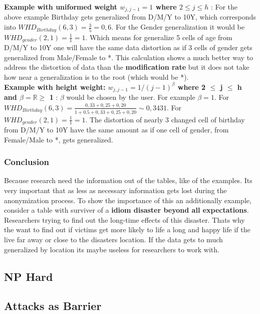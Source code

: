 \documentclass{llncs}
\newcommand{\R}{\mathbb{R}}
\begin{document}
\textbf{Example with uniformed weight $w_{j,j-1} = 1$ where $2\leq j \leq h$} \cite{li2006achieving}: For the above example Birthday gets generalized from D/M/Y to 10Y, which corresponds into $WHD_{Birthday}(6,3) = \frac{3}{5} = 0,6$. For the Gender generalization it would be $WHD_{gender}(2,1) = \frac{1}{1} = 1$. Which means for generalize 5 cells of age from D/M/Y to 10Y one will have the same data distortion as if 3 cells of gender gets generalized from Male/Female to *. This calculation shows a much better way to address the distortion of data than the \textbf{modification rate} but it does not take how near a generalization is to the root (which would be *).\\

\textbf{Example with height weight: $w_{j,j-1} = 1 / (j-1)^{\beta}$ where 2 $\leq$ j $\leq$ h and $\beta = \R \geq$ 1} \cite{li2006achieving}:
$\beta$ would be chosen by the user. For example $\beta = 1$. For $WHD_{Birthday}(6,3) = \frac{0,\overline{33}+0,25+0,20}{1+0.5+0,\overline{33}+0,25+0,20} \sim 0,3431$. For $WHD_{gender}(2,1) = \frac{1}{1} = 1$. The distortion of nearly 3 changed cell of birthday from D/M/Y to  10Y have the same amount as if one cell of gender, from Female/Male to *, gets generalized. 

\subsubsection{Conclusion}

Because research need the information out of the tables, like of the examples. Its very important that as less as necessary information gets lost during the anonymization process. To show the importance  of this an additionally example, consider a table with surviver of a \textbf{idiom disaster beyond all expectations}. Researchers trying to find out the long-time effects of this disaster. Thats why the want to find out if victims get more likely to life a long and happy life if the live far away or close to the disasters location. If the data gets to much generalized by location its maybe useless for researchers to work with.


\subsection{NP Hard}

\subsection{Attacks as Barrier}
\end{document}
